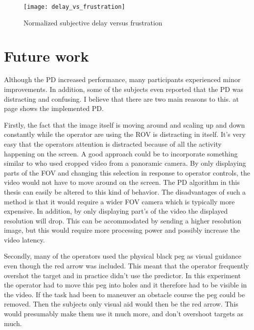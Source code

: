 
\begin{figure}[h!]
    \centering
    \texttt{[image: delay\_vs\_frustration]}
    \caption{Normalized subjective delay versus frustration}
    \label{delay_vs_frustration}
\end{figure}


\section{Future work}

Although the PD increased performance, many participants experienced minor improvements. In addition, some of the subjects even reported that the PD was distracting and confusing. I believe that there are two main reasons to this.  at page \pageref{predictorvis} shows the implemented PD.

Firstly, the fact that the image itself is moving around and scaling up and down constantly while the operator are using the ROV is distracting in itself. It's very easy that the operators attention is distracted because of all the activity happening on the screen. A good approach could be to incorporate something similar to \citep{Baldwin1999} who used cropped video from a panoramic camera. By only displaying parts of the FOV and changing this selection in response to operator controls, the video would not have to move around on the screen. The PD algorithm in this thesis can easily be altered to this kind of behavior. The disadvantages of such a method is that it would require a wider FOV camera which is typically more expensive. In addition, by only displaying part's of the video the displayed resolution will drop. This can be accommodated by sending a higher resolution image, but this would require more processing power and possibly increase the video latency.

Secondly, many of the operators used the physical black peg as visual guidance even though the red arrow was included. This meant that the operator frequently overshot the target and in practice didn't use the predictor. In this experiment the operator had to move this peg into holes and it therefore had to be visible in the video. If the task had been to maneuver an obstacle course the peg could be removed. Then the subjects only visual aid would then be the red arrow. This would presumably make them use it much more, and don't overshoot targets as much.


